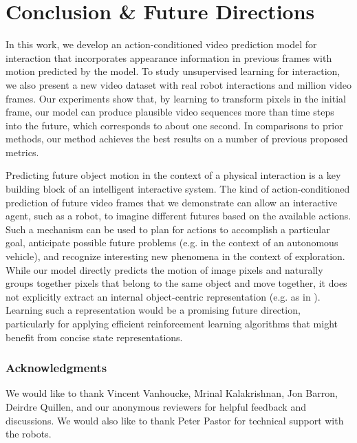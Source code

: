 \documentclass{article}
\begin{document}
\section{Conclusion \& Future Directions}

In this work, we develop an action-conditioned video prediction model for interaction that incorporates appearance information in
previous frames with motion predicted by the model. To study unsupervised learning for interaction, we also present
a new video dataset with  real robot interactions and  million video frames. Our experiments show that, by learning to
transform pixels in the initial frame, our model can produce plausible video sequences more than  time steps into the future, which corresponds to about one second.
In comparisons to prior methods, our method achieves the best results on a number of previous proposed metrics.

Predicting future object motion in the context of a physical interaction is a
key building block of an intelligent interactive system.
The kind of action-conditioned prediction of future video frames that we
demonstrate can allow an interactive agent, such as a robot, to imagine
different futures based on the available actions. Such a mechanism can be used to plan for actions to accomplish a particular goal, anticipate possible future problems
(e.g. in the context of an autonomous vehicle), and recognize interesting new phenomena in the context of exploration.
While our model directly predicts the motion of image pixels and naturally groups together pixels that belong to the same object and move together, it does not explicitly
extract an internal object-centric representation (e.g. as in \cite{ehwtkh-air-16}). Learning such a representation would be a promising future direction,
particularly for applying efficient reinforcement learning algorithms that might benefit from concise state representations.



\vspace{-0.1cm}
\subsubsection*{Acknowledgments}
We would like to thank Vincent Vanhoucke, Mrinal Kalakrishnan, Jon Barron, Deirdre Quillen, and our anonymous reviewers for helpful feedback and discussions.
We would also like to thank Peter Pastor for technical support with the robots.


\iffalse
\let\OLDthebibliography\thebibliography
\renewcommand\thebibliography[1]{
	\OLDthebibliography{#1}
\setlength{\itemsep}{5pt plus 0.3ex}
}
\fi
\end{document}
